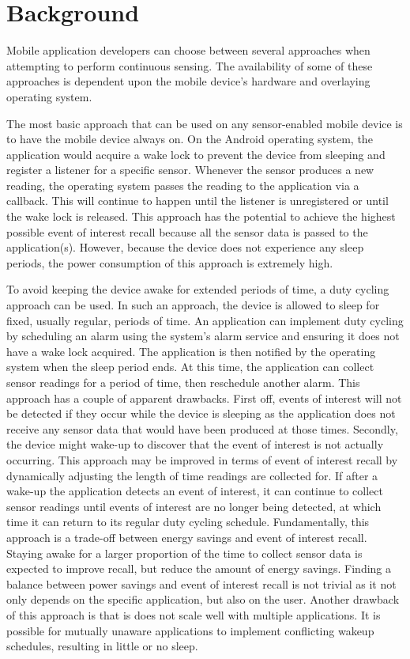 
\section{Background}
\label{sec:background}

Mobile application developers can choose between several approaches
when attempting to perform continuous sensing. The availability of
some of these approaches is dependent upon the mobile device's
hardware and overlaying operating system.

The most basic approach that can be used on any sensor-enabled mobile
device is to have the mobile device always on. On the Android
operating system, the application would acquire a wake lock to prevent
the device from sleeping and register a listener for a specific
sensor. Whenever the sensor produces a new reading, the operating
system passes the reading to the application via a callback. This will
continue to happen until the listener is unregistered or until the
wake lock is released. This approach has the potential to achieve the
highest possible event of interest recall because all the sensor data
is passed to the application(s). However, because the device does not
experience any sleep periods, the power consumption of this approach
is extremely high.

To avoid keeping the device awake for extended periods of time, a duty
cycling approach can be used. In such an approach, the device is
allowed to sleep for fixed, usually regular, periods of time. An
application can implement duty cycling by scheduling an alarm using
the system's alarm service and ensuring it does not have a wake lock
acquired. The application is then notified by the operating system
when the sleep period ends. At this time, the application can collect
sensor readings for a period of time, then reschedule another alarm.
This approach has a couple of apparent drawbacks. First off, events of
interest will not be detected if they occur while the device is
sleeping as the application does not receive any sensor data that
would have been produced at those times. Secondly, the device might
wake-up to discover that the event of interest is not actually
occurring. This approach may be  improved in terms of event of
interest recall by dynamically adjusting the length of time readings
are collected for. If after a wake-up the application detects an event
of interest, it can continue to collect sensor readings until events
of interest are no longer being detected, at which time it can return
to its regular duty cycling schedule. Fundamentally, this approach is
a trade-off between energy savings and event of interest recall.
Staying awake for a larger proportion of the time to collect sensor
data is expected to improve recall, but reduce the amount of energy
savings. Finding a balance between power savings and event of interest
recall is not trivial as it not only depends on the specific
application, but also on the user. Another drawback of this approach
is that is does not scale well with multiple applications. It is
possible for mutually unaware applications to implement conflicting
wakeup schedules, resulting in little or no sleep.

